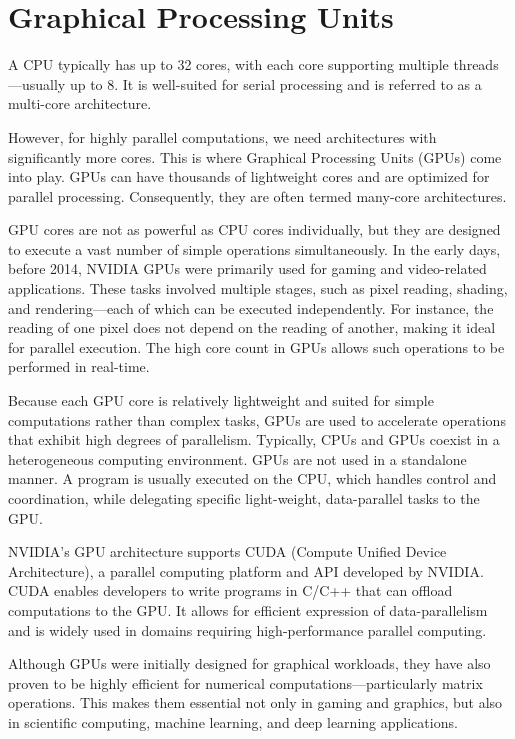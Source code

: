 \documentclass[12pt]{book}
\begin{document}
\chapter{Graphical Processing Units}

A CPU typically has up to 32 cores, with each core supporting multiple threads—usually up to 8. It is well-suited for serial processing and is referred to as a multi-core architecture.

However, for highly parallel computations, we need architectures with significantly more cores. This is where Graphical Processing Units (GPUs) come into play. GPUs can have thousands of lightweight cores and are optimized for parallel processing. Consequently, they are often termed many-core architectures.

GPU cores are not as powerful as CPU cores individually, but they are designed to execute a vast number of simple operations simultaneously. In the early days, before 2014, NVIDIA GPUs were primarily used for gaming and video-related applications. These tasks involved multiple stages, such as pixel reading, shading, and rendering—each of which can be executed independently. For instance, the reading of one pixel does not depend on the reading of another, making it ideal for parallel execution. The high core count in GPUs allows such operations to be performed in real-time.

Because each GPU core is relatively lightweight and suited for simple computations rather than complex tasks, GPUs are used to accelerate operations that exhibit high degrees of parallelism. Typically, CPUs and GPUs coexist in a heterogeneous computing environment. GPUs are not used in a standalone manner. A program is usually executed on the CPU, which handles control and coordination, while delegating specific light-weight, data-parallel tasks to the GPU.

NVIDIA's GPU architecture supports CUDA (Compute Unified Device Architecture), a parallel computing platform and API developed by NVIDIA. CUDA enables developers to write programs in C/C++ that can offload computations to the GPU. It allows for efficient expression of data-parallelism and is widely used in domains requiring high-performance parallel computing.

Although GPUs were initially designed for graphical workloads, they have also proven to be highly efficient for numerical computations—particularly matrix operations. This makes them essential not only in gaming and graphics, but also in scientific computing, machine learning, and deep learning applications.
\end{document}
